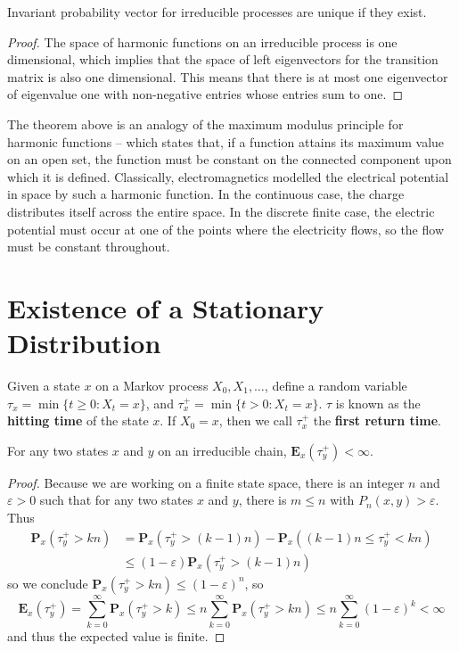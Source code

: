 \begin{corollary}
    Invariant probability vector for irreducible processes are unique if they exist.
\end{corollary}
\begin{proof}
    The space of harmonic functions on an irreducible process is one dimensional, which implies that the space of left eigenvectors for the transition matrix is also one dimensional. This means that there is at most one eigenvector of eigenvalue one with non-negative entries whose entries sum to one.
\end{proof}

The theorem above is an analogy of the maximum modulus principle for harmonic functions -- which states that, if a function attains its maximum value on an open set, the function must be constant on the connected component upon which it is defined. Classically, electromagnetics modelled the electrical potential in space by such a harmonic function. In the continuous case, the charge distributes itself across the entire space. In the discrete finite case, the electric potential must occur at one of the points where the electricity flows, so the flow must be constant throughout.

\section{Existence of a Stationary Distribution}

Given a state $x$ on a Markov process $X_0, X_1, \dots$, define a random variable $\tau_x = \min \{ t \geq 0: X_t = x \}$, and $\tau_x^+ = \min \{ t > 0 : X_t = x \}$. $\tau$ is known as the {\bf hitting time} of the state $x$. If $X_0 = x$, then we call $\tau_x^+$ the {\bf first return time}.

\begin{lemma}
    For any two states $x$ and $y$ on an irreducible chain, $\mathbf{E}_x(\tau_y^+) < \infty$.
\end{lemma}
\begin{proof}
    Because we are working on a finite state space, there is an integer $n$ and $\varepsilon > 0$ such that for any two states $x$ and $y$, there is $m \leq n$ with $P_n(x,y) > \varepsilon$. Thus
    \begin{align*}
        \mathbf{P}_x(\tau_y^+ > kn) &= \mathbf{P}_x(\tau_y^+ > (k-1)n) - \mathbf{P}_x((k-1)n \leq \tau_y^+ < kn)\\
        &\leq (1 - \varepsilon) \mathbf{P}_x(\tau_y^+ > (k-1)n)
    \end{align*}
    so we conclude $\mathbf{P}_x(\tau_y^+ > kn) \leq (1 - \varepsilon)^n$, so
    \[ \mathbf{E}_x(\tau_y^+) = \sum_{k = 0}^\infty \mathbf{P}_x(\tau_y^+ > k) \leq n \sum_{k = 0}^\infty \mathbf{P}_x(\tau_y^+ > kn) \leq n \sum_{k = 0}^\infty (1 - \varepsilon)^k < \infty \]
    and thus the expected value is finite.
\end{proof}


